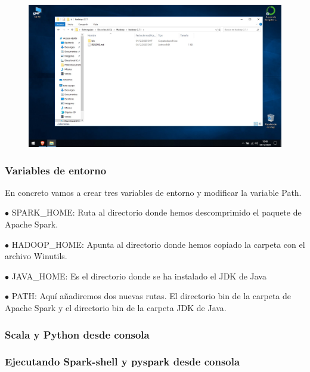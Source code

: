 \documentclass[a4paper,10pt]{article}
\begin{document}
\begin{figure}[H]
\begin{center}
\includegraphics[width=500pt]{./fotos/introduccion/17 - Hadoop.jpg}
\end{center}
\end{figure}

\subsubsection{Variables de entorno}

En concreto vamos a crear tres variables de entorno y modificar la variable Path.

$\bullet$ SPARK\_HOME: Ruta al directorio donde hemos descomprimido el paquete de Apache Spark. 

$\bullet$ HADOOP\_HOME: Apunta al directorio donde hemos copiado la carpeta con el archivo Winutils. 

$\bullet$ JAVA\_HOME: Es el directorio donde se ha instalado el JDK de Java

$\bullet$ PATH: Aquí añadiremos dos nuevas rutas. El directorio bin de la carpeta de Apache Spark y el directorio bin de la carpeta JDK de Java. 

\subsubsection{Scala y Python desde consola}

\subsubsection{Ejecutando Spark-shell y pyspark desde consola}
\end{document}
